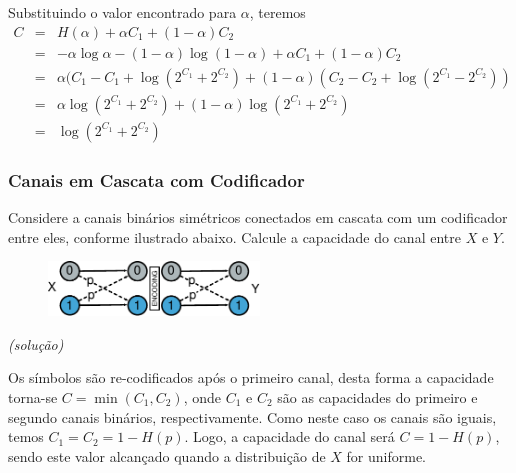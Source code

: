 \begin{frame}[allowframebreaks]
\begin{exercise}
  \exercisebreak
  Substituindo o valor encontrado para $\alpha$, teremos
  \begin{eqnarray}
  C &=& H(\alpha) + \alpha C_1 + (1 - \alpha) C_2 \nonumber \\
	&=& -\alpha \log \alpha - (1 - \alpha) \log (1 - \alpha) + \alpha C_1 + (1 - \alpha) C_2 \nonumber \\
	&=& \alpha (C_1 - C_1 + \log (2^{C_1} + 2^{C_2}) + (1-\alpha)(C_2 - C_2 + \log(2^{C_1}-2^{C_2})) \nonumber \\
	&=& \alpha \log (2^{C_1} + 2^{C_2}) + (1 - \alpha) \log (2^{C_1} + 2^{C_2}) \nonumber \\
	&=& \log (2^{C_1} + 2^{C_2}) 
  \end{eqnarray}   
  \end{exercise}

\end{frame}


\begin{frame}[allowframebreaks]
  \frametitle{Canais em Cascata com Codificador}
  \begin{exercise}

  Considere a canais binários simétricos conectados em cascata com um codificador entre
  eles, conforme ilustrado abaixo. Calcule a capacidade do canal entre $X$ e $Y$.
  \begin{figure}[h!]
  \centering
  \includegraphics[width=0.5\textwidth]{images/c-enc-c.pdf}
  \label{fig:c-enc-c}
  \end{figure}

  \exercisebreak
  \textit{(solução)}

  Os símbolos são re-codificados após o primeiro canal, desta forma a 
  capacidade torna-se $C = \min (C_1, C_2)$, onde $C_1$ e $C_2$ são as
  capacidades do primeiro e segundo canais binários, respectivamente.
  Como neste caso os canais são iguais, temos $C_1 = C_2 = 1 - H(p)$.
  Logo, a capacidade do canal será $C = 1 - H(p)$, sendo este valor alcançado
  quando a distribuição de $X$ for uniforme.
 
  \end{exercise}
\end{frame}


